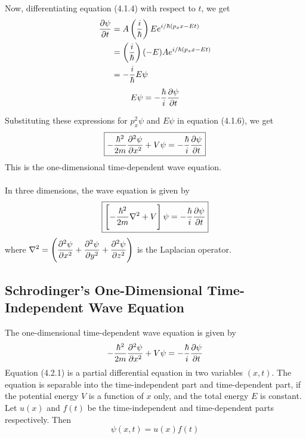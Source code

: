 \documentclass[12pt]{article}
\numberwithin{equation}{subsection}
\begin{document}
Now, differentiating equation (4.1.4) with respect to $t$, we get
\begin{align*}
    \pdv{\psi}{t} &= A \left( \frac{i}{\hbar} \right) E e^{i/\hbar (p_x x - Et)} \\
    &= \left( \frac{i}{\hbar} \right) (-E) A e^{i/\hbar (p_x x - Et)} \\
    &= -\frac{i}{\hbar} E \psi
\end{align*}
\begin{equation}
    E\psi = -\frac{\hbar}{i} \pdv{\psi}{t}
\end{equation}

Substituting these expressions for $p_{x}^2\psi$ and $E\psi$ in equation (4.1.6), we get
\begin{equation}
    \boxed{ -\frac{\hbar^2}{2m} \pdv[2]{\psi}{x} + V\psi = -\frac{\hbar}{i} \pdv{\psi}{t} }
\end{equation}
This is the one-dimensional time-dependent wave equation. \\~\\

In three dimensions, the wave equation is given by
\begin{equation}
    \boxed{ \left[ -\frac{\hbar^2}{2m} \nabla^2 + V \right] \psi = -\frac{\hbar}{i} \pdv{\psi}{t} }
\end{equation}
where $\displaystyle \nabla^2 = \left( \pdv[2]{\psi}{x} + \pdv[2]{\psi}{y} + \pdv[2]{\psi}{z} \right)$ is the Laplacian operator.


\subsection{Schrodinger's One-Dimensional Time-Independent Wave Equation}
The one-dimensional time-dependent wave equation is given by
\begin{equation}
    -\frac{\hbar^2}{2m} \pdv[2]{\psi}{x} + V\psi = -\frac{\hbar}{i} \pdv{\psi}{t} 
\end{equation}
Equation (4.2.1) is a partial differential equation in two variables $(x,t)$. The equation is separable into the time-independent part and time-dependent part, if the potential energy $V$ is a function of $x$ only, and the total energy $E$ is constant.\\
Let $u(x)$ and $f(t)$ be the time-independent and time-dependent parts respectively. Then
\begin{equation}
    \psi(x,t) = u(x)f(t)
\end{equation}
\end{document}
